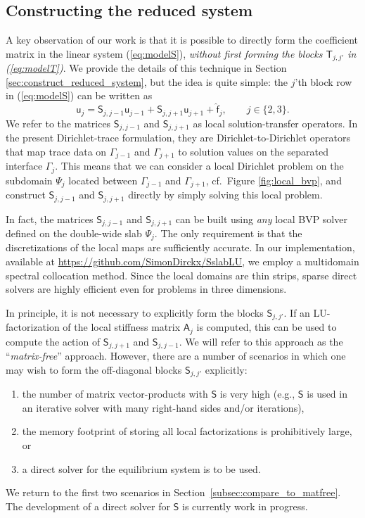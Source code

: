 \documentclass[final,onefignum,onetabnum]{siamart250211}
\newcommand{\vct}[1]{\bm{\mathsf{#1}}}
\newcommand{\mtx}[1]{\bm{\mathsf{#1}}}
\theoremstyle{definition}
\begin{document}
\subsection{Constructing the reduced system}\label{sec:ConstructS}

A key observation of our work is that it is possible to directly
form the coefficient matrix in the linear system (\ref{eq:modelS}),
\textit{without first forming the blocks $\mtx{T}_{j,j'}$ in (\ref{eq:modelT})}.
We provide the details of this technique in Section \ref{sec:construct_reduced_system}, but the
idea is quite simple: the $j$'th block row  in (\ref{eq:modelS})
can be written as
\begin{equation}
\label{eq:localS}
\vct{u}_{j} = \mtx{S}_{j,j-1}\vct{u}_{j-1} + \mtx{S}_{j,j+1}\vct{u}_{j+1} + \widehat{\vct{f}}_{j},
\qquad j \in \{2,3\}.
\end{equation}
We refer to the matrices $\mtx{S}_{j,j-1}$ and $\mtx{S}_{j,j+1}$ as local solution-transfer operators. In the present Dirichlet-trace formulation, they are Dirichlet-to-Dirichlet operators that map trace data on $\Gamma_{j-1}$ and $\Gamma_{j+1}$ to solution values on the separated interface $\Gamma_j$. This means that we can consider a local Dirichlet problem on the subdomain $\Psi_{j}$ located between $\Gamma_{j-1}$ and $\Gamma_{j+1}$, cf.~Figure \ref{fig:local_bvp}, and construct $\mtx{S}_{j,j-1}$ and $\mtx{S}_{j,j+1}$ directly by simply solving this local problem.

In fact, the matrices $\mtx{S}_{j,j-1}$ and $\mtx{S}_{j,j+1}$ can be built using
\textit{any} local BVP solver defined on the double-wide slab $\Psi_{j}$.  The only requirement is that the discretizations of the local maps are sufficiently accurate.  In our implementation, available at \url{https://github.com/SimonDirckx/SslabLU}, we employ a multidomain spectral collocation method. Since the local domains are thin strips, sparse direct solvers are highly efficient even for problems in three dimensions.

In principle, it is not necessary to explicitly form the blocks $\mtx{S}_{j,j'}$. If an LU-factorization of the local stiffness matrix $\mtx{A}_{j}$ is computed, this can be used to compute the action of $\mtx{S}_{j,j+1}$ and $\mtx{S}_{j,j-1}$. We will refer to this approach as the ``\textit{matrix-free}'' approach. However, there are a number of scenarios in which one may wish to form the off-diagonal blocks $\mtx{S}_{j,j'}$ explicitly:
\begin{enumerate}
    \item the number of matrix vector-products with $\mtx{S}$ is very high (e.g., $\mtx{S}$ is used in an iterative solver with many right-hand sides and/or iterations),
    \item the memory footprint of storing all local factorizations is prohibitively large, or
    \item a direct solver for the equilibrium system is to be used.
\end{enumerate}
We return to the first two scenarios in Section~\ref{subsec:compare_to_matfree}. The development of a direct solver for $\mtx{S}$ is currently work in progress. 
\end{document}
